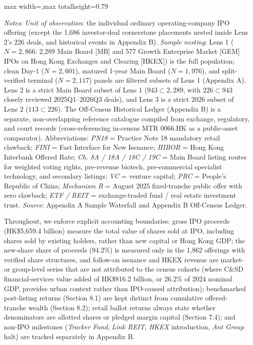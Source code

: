 \documentclass[11pt,letterpaper]{article}
\begin{document}
\begin{table}[!htbp]
\begin{adjustbox}{max width=\textwidth,max totalheight=0.79\textheight}
\end{adjustbox}
\par\vspace{3pt}\noindent\parbox{\textwidth}{\scriptsize\raggedright \textit{Notes}: \textit{Unit of observation}: the individual ordinary operating-company IPO offering (except the 1,686 investor-deal cornerstone placements nested inside Lens 2's 226 deals, and historical events in Appendix B). \textit{Sample nesting}: Lens 1 ($N = 2,866$: 2,289 Main Board [MB] and 577 Growth Enterprise Market [GEM] IPOs on Hong Kong Exchanges and Clearing [HKEX]) is the full population; clean Day-1 ($N = 2,601$), matured 1-year Main Board ($N = 1,976$), and split-verified terminal ($N = 2,117$) panels are filtered subsets of Lens 1 (Appendix A). Lens 2 is a strict Main Board subset of Lens 1 ($943 \subset 2,289$, with $226 \subset 943$ closely reviewed 2025Q1–2026Q3 deals), and Lens 3 is a strict 2026 subset of Lens 2 ($113 \subset 226$). The Off-Census Historical Ledger (Appendix B) is a separate, non-overlapping reference catalogue compiled from exchange, regulatory, and court records (cross-referencing in-census MTR 0066.HK as a public-asset comparator). Abbreviations: \textit{PN18} = Practice Note 18 mandatory retail clawback; \textit{FINI} = Fast Interface for New Issuance; \textit{HIBOR} = Hong Kong Interbank Offered Rate; \textit{Ch. 8A / 18A / 18C / 19C} = Main Board listing routes for weighted voting rights, pre-revenue biotech, pre-commercial specialist technology, and secondary listings; \textit{VC} = venture capital; \textit{PRC} = People's Republic of China; \textit{Mechanism B} = August 2025 fixed-tranche public offer with zero clawback; \textit{ETF / REIT} = exchange-traded fund / real estate investment trust. \textit{Source}: Appendix A Sample Waterfall and Appendix B Off-Census Ledger.}
\end{table}

Throughout, we enforce explicit accounting boundaries: gross IPO proceeds (HK\$5,659.4 billion) measure the total value of shares sold at IPO, including shares sold by existing holders, rather than new capital or Hong Kong GDP; the new-share share of proceeds (94.2\%) is measured only in the 1,862 offerings with verified share structures, and follow-on issuance and HKEX revenue are market- or group-level series that are not attributed to the census cohorts (where C\&SD financial-services value added of HK\$816.2 billion, or 26.2\% of 2024 nominal GDP, provides urban context rather than IPO-caused attribution); benchmarked post-listing returns (Section 8.1) are kept distinct from cumulative offered-tranche wealth (Section 8.2); retail ballot returns always state whether denominators are allotted shares or pledged margin capital (Section 7.4); and non-IPO milestones (\textit{Tracker Fund}, \textit{Link REIT}, \textit{HKEX} introduction, \textit{Ant Group} halt) are tracked separately in Appendix B.
\end{document}
